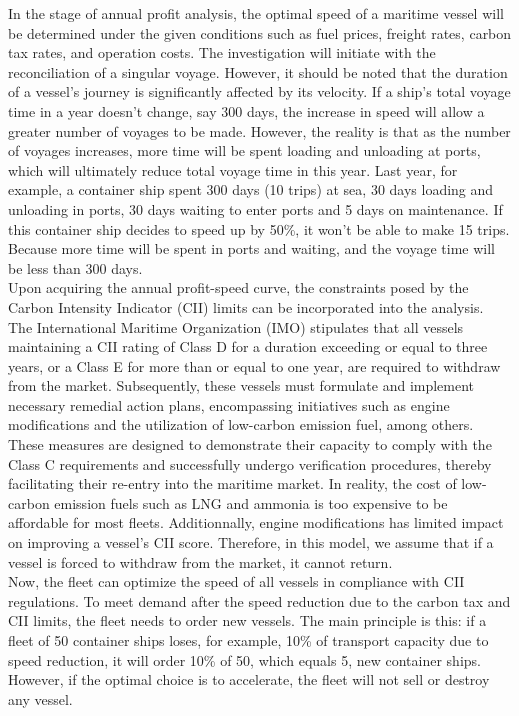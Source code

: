 \documentclass[a4paper,12pt]{article}
\begin{document}
In the stage of annual profit analysis, the optimal speed of a maritime vessel will be determined under the given conditions such as fuel prices, freight rates, carbon tax rates, and operation costs.
The investigation will initiate with the reconciliation of a singular voyage.
However, it should be noted that the duration of a vessel's journey is significantly affected by its velocity.
If a ship's total voyage time in a year doesn't change, say 300 days, the increase in speed will allow a greater number of voyages to be made. 
However, the reality is that as the number of voyages increases, more time will be spent loading and unloading at ports, which will ultimately reduce total voyage time in this year. 
Last year, for example, a container ship spent 300 days (10 trips) at sea, 30 days loading and unloading in ports, 30 days waiting to enter ports and 5 days on maintenance.
If this container ship decides to speed up by 50\%, it won't be able to make 15 trips. 
Because more time will be spent in ports and waiting, and the voyage time will be less than 300 days. \\

Upon acquiring the annual profit-speed curve, the constraints posed by the Carbon Intensity Indicator (CII) limits can be incorporated into the analysis.
The International Maritime Organization (IMO) stipulates that all vessels maintaining a CII rating of Class D for a duration exceeding or equal to three years, or a Class E for more than or equal to one year, are required to withdraw from the market.
Subsequently, these vessels must formulate and implement necessary remedial action plans, encompassing initiatives such as engine modifications and the utilization of low-carbon emission fuel, among others.
These measures are designed to demonstrate their capacity to comply with the Class C requirements and successfully undergo verification procedures, thereby facilitating their re-entry into the maritime market.
In reality, the cost of low-carbon emission fuels such as LNG and ammonia is too expensive to be affordable for most fleets.
Additionnally, engine modifications has limited impact on improving a vessel's CII score.
Therefore, in this model, we assume that if a vessel is forced to withdraw from the market, it cannot return.\\

Now, the fleet can optimize the speed of all vessels in compliance with CII regulations.
To meet demand after the speed reduction due to the carbon tax and CII limits, the fleet needs to order new vessels.
The main principle is this: if a fleet of 50 container ships loses, for example, 10\% of transport capacity due to speed reduction, it will order 10\% of 50, which equals 5, new container ships.
However, if the optimal choice is to accelerate, the fleet will not sell or destroy any vessel.\\
\end{document}
